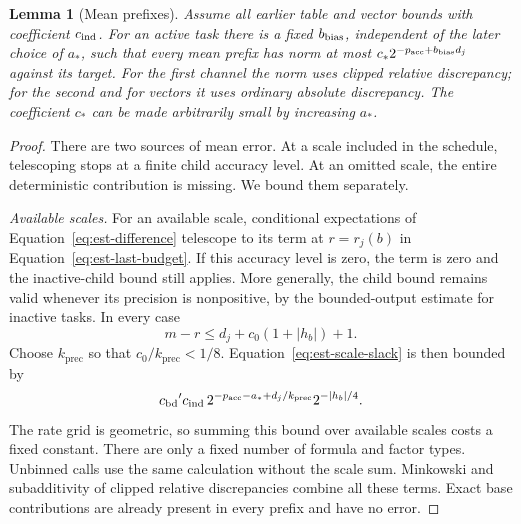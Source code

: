 \documentclass[11pt]{article}
\numberwithin{equation}{section}
\newtheorem{lemma}[theorem]{Lemma}
\theoremstyle{definition}
\theoremstyle{remark}
\begin{document}
\begin{lemma}[Mean prefixes]\label{lem:est-mean-prefix}
Assume all earlier table and vector bounds with coefficient ${c_{\rm ind}}$.
For an active task there is a fixed ${b_{\rm bias}}$, independent of the later
choice of ${a}_*$, such that every mean prefix has norm at most
$c_*2^{-{p_{\rm acc}}+{b_{\rm bias}}d_j}$ against its target.  For the first channel the norm
uses clipped relative discrepancy; for the second and for vectors it uses
ordinary absolute discrepancy.  The coefficient $c_*$ can be made
arbitrarily small by increasing ${a}_*$.
\end{lemma}
\begin{proof}
There are two sources of mean error. At a scale included in the schedule, telescoping stops at a finite child accuracy level. At an omitted scale, the entire deterministic contribution is missing. We bound them separately.

\emph{Available scales.}  For an available scale, conditional expectations of
Equation~\eqref{eq:est-difference} telescope to its term at
${r}={r}_j(b)$ in Equation~\eqref{eq:est-last-budget}.  If this accuracy level is
zero, the term is zero and the inactive-child bound still applies.
More generally, the child bound remains valid whenever its precision is
nonpositive, by the bounded-output estimate for inactive tasks.
In every case
\[
 {m}-{r}\le d_j+c_0(1+|h_b|)+1.
\]
Choose ${k}_{\mathrm{prec}}$ so that $c_0/{k}_{\mathrm{prec}}<1/8$.
Equation~\eqref{eq:est-scale-slack} is then bounded by
\[
 {c_{\rm bd}}' {c_{\rm ind}}\,2^{-{p_{\rm acc}}-{a}_*+d_j/{k}_{\mathrm{prec}}}2^{-|h_b|/4}.
\]
The rate grid is geometric, so summing this bound over available scales
costs a fixed constant.  There are only a fixed number of formula and
factor types.  Unbinned calls use the same calculation without the scale
sum.  Minkowski and subadditivity of clipped relative discrepancies
combine all these terms.  Exact base contributions are already present
in every prefix and have no error.


\end{proof}
\end{document}
